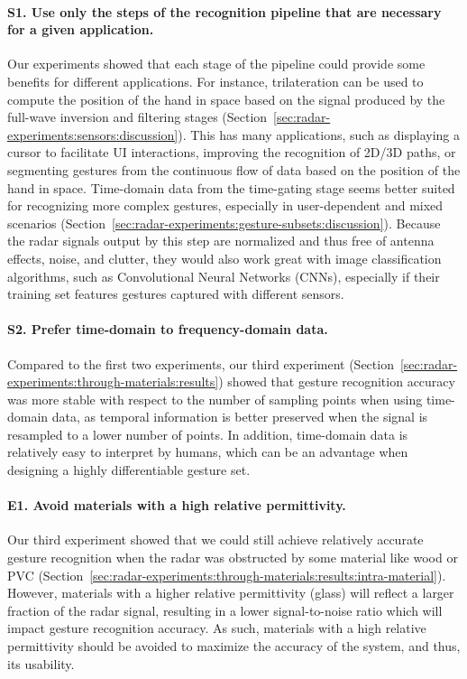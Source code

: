 


\paragraph{S1. Use only the steps of the recognition pipeline that are necessary for a given application.}
Our experiments showed that each stage of the pipeline could provide some benefits for different applications. 
%
For instance, trilateration can be used to compute the position of the hand in space based on the signal produced by the full-wave inversion and filtering stages (Section~\ref{sec:radar-experiments:sensors:discussion}). This has many applications, such as displaying a cursor to facilitate UI interactions, improving the recognition of 2D/3D paths, or segmenting gestures from the continuous flow of data based on the position of the hand in space.
%
Time-domain data from the time-gating stage seems better suited for recognizing more complex gestures, especially in user-dependent and mixed scenarios (Section~\ref{sec:radar-experiments:gesture-subsets:discussion}). 
Because the radar signals output by this step are normalized and thus free of antenna effects, noise, and clutter, they would also work great with image classification algorithms, such as Convolutional Neural Networks (CNNs), especially if their training set features gestures captured with different sensors.

\paragraph{S2. Prefer time-domain to frequency-domain data.}
Compared to the first two experiments, our third experiment (Section~\ref{sec:radar-experiments:through-materials:results}) showed that gesture recognition accuracy was more stable with respect to the number of sampling points when using time-domain data, as temporal information is better preserved when the signal is resampled to a lower number of points. In addition, time-domain data is relatively easy to interpret by humans, which can be an advantage when designing a highly differentiable gesture set.

\paragraph{E1. Avoid materials with a high relative permittivity.} 
Our third experiment showed that we could still achieve relatively accurate gesture recognition when the radar was obstructed by some material like wood or PVC (Section~\ref{sec:radar-experiments:through-materials:results:intra-material}). 
%
However, materials with a higher relative permittivity (\eg glass) will reflect a larger fraction of the radar signal, resulting in a lower signal-to-noise ratio which will impact gesture recognition accuracy. 
%
As such, materials with a high relative permittivity should be avoided to maximize the accuracy of the system, and thus, its usability.

